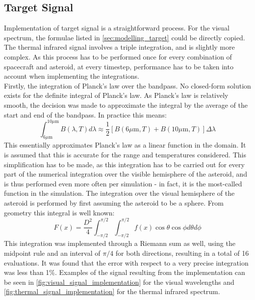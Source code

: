\subsection{Target Signal}
Implementation of target signal is a straightforward process. For the visual spectrum, the formulae listed in \autoref{sec:modelling_target} could be directly copied. The thermal infrared signal involves a triple integration, and is slightly more complex. As this process has to be performed once for every combination of spacecraft and asteroid, at every timestep, performance has to be taken into account when implementing the integrations. \\

Firstly, the integration of Planck's law over the bandpass. No closed-form solution exists for the definite integral of Planck's law. As Planck's law is relatively smooth, the decision was made to approximate the integral by the average of the start and end of the bandpass. In practice this means:
\begin{equation}
 \int _{6 \mu\mathrm{m}}^{10 \mu\mathrm{m}} B(\lambda, T) d\lambda \approx \frac{1}{2}\left[B(6 \mu\mathrm{m}, T) + B(10 \mu\mathrm{m}, T)\right] \Delta \lambda
\end{equation}
This essentially approximates Planck's law as a linear function in the domain. It is assumed that this is accurate for the range and temperatures considered. This simplification has to be made, as this integration has to be carried out for every part of the numerical integration over the visible hemisphere of the asteroid, and is thus performed even more often per simulation - in fact, it is the most-called function in the simulation. The integration over the visual hemisphere of the asteroid is performed by first assuming the asteroid to be a sphere. From geometry this integral is well known:
\begin{equation}
 F(x) = \frac{D^2}{4}\int_{-\pi/2}^{\pi/2}\int_{-\pi/2}^{\pi/2} f(x) \cos \theta \cos \phi d \theta d \phi
\end{equation}
This integration was implemented through a Riemann sum as well, using the midpoint rule and an interval of $\pi/4$ for both directions, resulting in a total of 16 evaluations. It was found that the error with respect to a very precise integration was less than 1\%. Examples of the signal resulting from the implementation can be seen in \autoref{fig:visual_signal_implementation} for the visual wavelengths and \autoref{fig:thermal_signal_implementation} for the thermal infrared spectrum.

